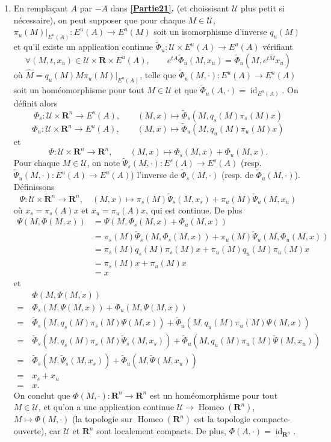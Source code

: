 \documentclass[french, 12pt]{article}
\theoremstyle{definition}
\newcommand{\wh}[1]{\widehat{#1}}
\newcommand{\wt}[1]{\widetilde{#1}}
\newcommand{\Rbb}{\mathbf{R}}
\newcommand{\Ucal}{\mathcal{U}}
\newcommand{\id}{\operatorname{id}}
\newcommand{\Homeo}{\operatorname{Homeo}}
\begin{document}
\begin{enumerate}
    \item \label{Partie22} En rempla\c cant $A$ par $-A$ dans {\bf \ref{Partie21}.} (et choissisant $\Ucal$ plus petit si n\'ecessaire), on peut supposer que pour chaque $M \in \Ucal$, $\pi_u(M)|_{E^u(A)}:E^u(A) \to E^u(M)$ soit un isomorphisme d'inverse $q_u(M)$ et qu'il existe un application continue $\wt{\Phi}_u : \Ucal \times E^u(A) \to E^u(A)$ v\'erifiant
        $$\forall (M,t,x_u) \in \Ucal \times \Rbb \times E^u(A), \qquad e^{tA} \wt{\Phi}_u(M,x_u) = \wt{\Phi}_u(M, e^{t\wh{M}}x_u)$$
    o\`u $\wh{M} = q_u(M)M\pi_u(M)|_{E^u(A)}$, telle que $\wt{\Phi}_u(M,\cdot):E^u(A) \to E^u(A)$ soit un hom\'eomorphisme pour tout $M \in \Ucal$ et que $\wt{\Phi}_u(A,\cdot) = \id_{E^u(A)}$. On d\'efinit alors
        $$\Phi_s: \Ucal \times \Rbb^n \to E^s(A), \qquad (M,x) \mapsto \wt{\Phi}_s(M,q_s(M)\pi_s(M)x)$$
        $$\Phi_u: \Ucal \times \Rbb^n \to E^u(A), \qquad (M,x) \mapsto \wt{\Phi}_u(M,q_u(M)\pi_u(M)x)$$
    et
        $$\Phi: \Ucal \times \Rbb^n \to \Rbb^n, \qquad (M,x) \mapsto \Phi_s(M,x) + \Phi_u(M,x).$$
    Pour chaque $M \in \Ucal$, on note $\wt{\Psi}_s(M, \cdot): E^s(A) \to E^s(A)$ (resp. $\wt{\Psi}_u(M, \cdot): E^u(A) \to E^u(A)$) l'inverse de $\wt{\Phi}_s(M,\cdot)$ (resp. de $\wt{\Phi}_u(M, \cdot)$). D\'efinissons
        $$\Psi: \Ucal \times \Rbb^n \to \Rbb^n, \quad (M,x) \mapsto \pi_s(M) \wt{\Psi}_s(M, x_s) + \pi_u(M) \wt{\Psi}_u(M, x_u)$$
    o\`u $x_s = \pi_s(A)x$ et $x_u = \pi_u(A)x$, qui est continue. De plus
        \begin{align*}
            \Psi(M,\Phi(M,x)) & = \Psi(M,\Phi_s(M,x) +\Phi_u(M,x))\\
            & = \pi_s(M)\wt{\Psi}_s(M, \Phi_s(M,x)) + \pi_u(M)\wt{\Psi}_u(M, \Phi_u(M,x))\\
            & = \pi_s(M) q_s(M) \pi_s(M)x + \pi_u(M) q_u(M) \pi_u(M)x\\
            & = \pi_s(M)x + \pi_u(M)x \\
            & = x
        \end{align*}
    et
        \begin{align*}
             & \Phi(M,\Psi(M,x))\\
            =\ & \Phi_s(M,\Psi(M,x)) + \Phi_u(M,\Psi(M,x))\\
            =\ & \wt{\Phi}_s(M,q_s(M)\pi_s(M)\Psi(M,x)) + \wt{\Phi}_u(M,q_u(M)\pi_u(M)\Psi(M,x)) \\
            =\ & \wt{\Phi}_s(M,q_s(M)\pi_s(M)\wt{\Psi}_s(M,x_s)) + \wt{\Phi}_u(M,q_u(M)\pi_u(M)\wt{\Psi}(M,x_u))\\
            =\ & \wt{\Phi}_s(M,\wt{\Psi}_s(M,x_s)) + \wt{\Phi}_u(M,\wt{\Psi}(M,x_u)) \\
            =\ & x_s + x_u \\
            =\ & x.
        \end{align*}
    On conclut que $\Phi(M,\cdot): \Rbb^n \to \Rbb^n$ est un hom\'eomorphisme pour tout $M \in \Ucal$, et qu'on a une application continue $\Ucal \to \Homeo(\Rbb^n)$, $M \mapsto \Phi(M,\cdot)$ (la topologie sur $\Homeo(\Rbb^n)$ est la topologie compacte-ouverte), car $\Ucal$ et $\Rbb^n$ sont localement compacts. De plus, $\Phi(A,\cdot) = \id_{\Rbb^n}$. 
    

\end{enumerate}
\end{document}

